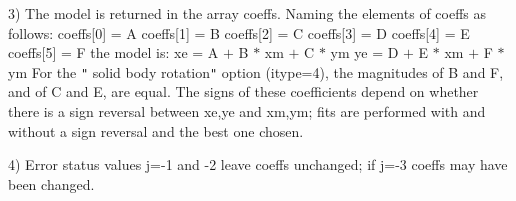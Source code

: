 \documentclass[twoside,11pt,nolof]{starlink}
\begin{document}
{{      3)  The model is returned in the array coeffs.  Naming the
          elements of coeffs as follows:
      \newline
      \newline
      \hspace*{1.5 em}
             coeffs[0] = A
      \newline
      \hspace*{1.5 em}
             coeffs[1] = B
      \newline
      \hspace*{1.5 em}
             coeffs[2] = C
      \newline
      \hspace*{1.5 em}
             coeffs[3] = D
      \newline
      \hspace*{1.5 em}
             coeffs[4] = E
      \newline
      \hspace*{1.5 em}
             coeffs[5] = F
      \newline
      \newline
          the model is:
      \newline
      \newline
      \hspace*{1.5 em}
             xe = A $+$ B $*$ xm $+$ C $*$ ym
      \newline
      \hspace*{1.5 em}
             ye = D $+$ E $*$ xm $+$ F $*$ ym
      \newline
      \newline
          For the \texttt{"} solid body rotation\texttt{"}  option (itype=4), the
          magnitudes of B and F, and of C and E, are equal.  The
          signs of these coefficients depend on whether there is a
          sign reversal between xe,ye and xm,ym;  fits are performed
          with and without a sign reversal and the best one chosen.

      4)  Error status values j=-1 and -2 leave coeffs unchanged;
          if j=-3 coeffs may have been changed.
   }
}
\end{document}
